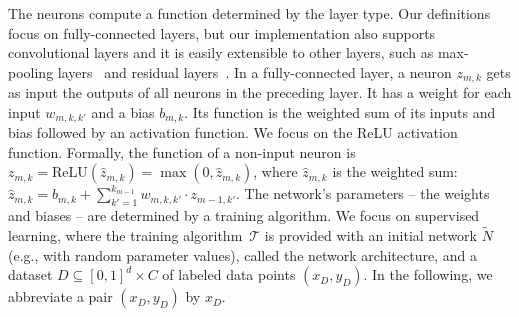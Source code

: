  The neurons compute a function determined by the layer type. %
  Our definitions focus on fully-connected layers, but our implementation also supports convolutional layers and it is easily extensible to other layers, such as max-pooling layers~\citep{ref_41} and residual layers~\citep{ref_40}. 
  In a fully-connected layer, a neuron $z_{m,k}$ 
   gets as input the outputs of all neurons in the preceding layer. 
   It has a weight for each input ${w}_{m,k,k'}$ and a bias $b_{m,k}$. Its function is the weighted sum of its inputs and bias followed by an activation function. We focus on the ReLU activation function. 
   Formally, the function of a non-input neuron is $z_{m,k}=\text{ReLU}(\hat{z}_{m,k})=\max(0,\hat{z}_{m,k})$, where $\hat{z}_{m,k}$
   is the weighted sum:
 $\hat{z}_{m,k}=b_{m,k}+\sum_{k'=1}^{k_{m-1}}{w}_{m,k,k'}\cdot{z}_{m-1,k'}$. 
%
The network's parameters -- the weights and biases -- are determined by a training algorithm. We focus on supervised learning, where the training algorithm~$\mathcal{T}$ is provided with an initial network $\widetilde{N}$ (e.g., with random parameter values), called the network architecture, and a dataset $D \subseteq [0,1]^d \times C$ of labeled data points $(x_D,y_D)$. In the following, we abbreviate a pair $(x_D,y_D)$ by $x_D$. 
